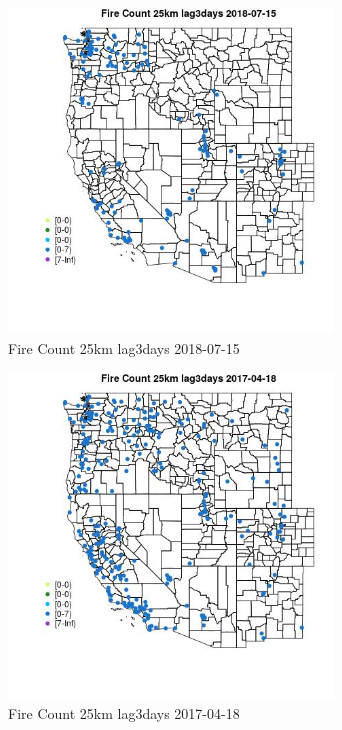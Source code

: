 \begin{figure} 
\centering  
\includegraphics[width=0.77\textwidth]{Code_Outputs/Report_ML_input_PM25_Step4_part_e_de_duplicated_aves_compiled_2019-05-21wNAs_MapObsFire_Count_25km_lag3days2018-07-15.jpg} 
\caption{\label{fig:Report_ML_input_PM25_Step4_part_e_de_duplicated_aves_compiled_2019-05-21wNAsMapObsFire_Count_25km_lag3days2018-07-15}Fire Count 25km lag3days 2018-07-15} 
\end{figure} 
 

\begin{figure} 
\centering  
\includegraphics[width=0.77\textwidth]{Code_Outputs/Report_ML_input_PM25_Step4_part_e_de_duplicated_aves_compiled_2019-05-21wNAs_MapObsFire_Count_25km_lag3days2017-04-18.jpg} 
\caption{\label{fig:Report_ML_input_PM25_Step4_part_e_de_duplicated_aves_compiled_2019-05-21wNAsMapObsFire_Count_25km_lag3days2017-04-18}Fire Count 25km lag3days 2017-04-18} 
\end{figure} 
 

